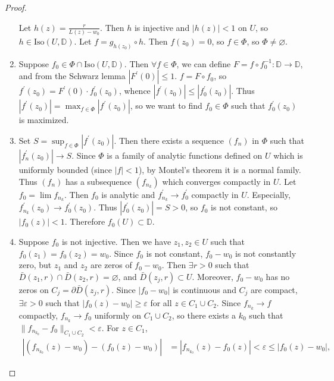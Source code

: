 \begin{proof}
\begin{enumerate}
{    Let $h(z) = \frac{r}{L(z) - w_0}$. Then $h$ is injective and
    $|h(z)| < 1$ on $U$, so
    $h \in \mathrm{Iso}(U, \mathbb{D})$.
    Let $f = g_{h(z_0)} \circ h$. Then $f(z_0) = 0$, so $f \in \Phi$,
    so $\Phi \neq \varnothing$.
  }
  \item{
    Suppose $f_0 \in \Phi \cap \mathrm{Iso}(U, \mathbb{D})$. Then
    $\forall f \in \Phi$, we can define
    $F = f \circ f_0^{-1} : \mathbb{D} \to \mathbb{D}$, and from
    the Schwarz lemma $|F^\prime(0)| \leq 1$.
    $f = F \circ f_0$, so
    $f^\prime(z_0) = F^\prime(0) \cdot f_0^\prime(z_0)$, whence
    $|f^\prime(z_0)| \leq |f_0^\prime(z_0)|$. Thus
    $|f^\prime(z_0)| = \max_{f \in \Phi} |f^\prime(z_0)|$, so we
    want to find $f_0 \in \Phi$ such that $f_0^\prime(z_0)$ is
    maximized.
  }
  \item{
    Set $S = \sup_{f \in \Phi} |f^\prime(z_0)|$. Then there exists a
    sequence $(f_n)$ in $\Phi$ such that $|f_n^\prime(z_0)| \to S$.
    Since $\Phi$ is a family of analytic functions defined on $U$
    which is uniformly bounded (since $|f| < 1$), by Montel's theorem
    it is a normal family. Thus $(f_n)$ has a subsequence $(f_{n_k})$ which
    converges compactly in $U$. Let $f_0 = \lim f_{n_k}$. Then
    $f_0$ is analytic and $f_{n_k}^\prime \to f_0^\prime$ compactly
    in $U$. Especially, $f_{n_k}^\prime(z_0) \to f_0^\prime(z_0)$.
    Thus $|f_0^\prime(z_0)| = S > 0$,
    so $f_0$ is not constant, so $|f_0(z)| < 1$. Therefore
    $f_0(U) \subset \mathbb{D}$.
  }
  \item{
    Suppose $f_0$ is not injective. Then we have $z_1, z_2 \in U$
    such that $f_0(z_1) = f_0(z_2) = w_0$. Since $f_0$ is not constant,
    $f_0 - w_0$ is not constantly zero, but $z_1$ and $z_2$ are zeros
    of $f_0 - w_0$. Then $\exists r > 0$ such that
    $\bar{D}(z_1, r) \cap \bar{D}(z_2, r) = \varnothing$, and
    $\bar{D}(z_j, r) \subset U$. Moreover, $f_0 - w_0$ has no zeros
    on $C_j = \partial \bar{D}(z_j, r)$. Since $|f_0 - w_0|$ is
    continuous and $C_j$ are compact, $\exists \varepsilon > 0$
    such that $|f_0(z) - w_0| \geq \varepsilon$ for all
    $z \in C_1 \cup C_2$. Since $f_{n_k} \to f$ compactly,
    $f_{n_k} \to f_0$ uniformly on $C_1 \cup C_2$, so there exists
    a $k_0$ such that $\| f_{n_{k_0}} - f_0 \|_{C_1 \cup C_2} <
    \varepsilon$.
    For $z \in C_1$,
    \begin{align*}
          |(f_{n_{k_0}}(z) - w_0) - (f_0(z) - w_0)|
    &=    |f_{n_{k_0}}(z) - f_0(z)|
     <    \varepsilon
     \leq |f_0(z) - w_0|,
    \end{align*}
}
\end{enumerate}
\end{proof}

